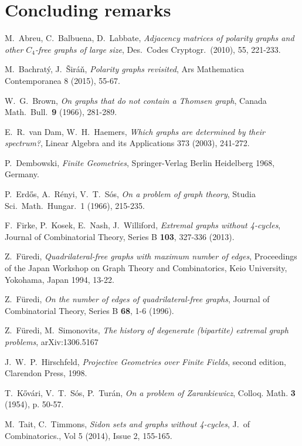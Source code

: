 \documentclass[12pt]{article}
\begin{document}
\section{Concluding remarks}\label{conclusion}
\begin{thebibliography}{10}

    M.\ Abreu, C.\ Balbuena, D.\ Labbate,
    {\em Adjacency matrices of polarity graphs and other $C_4$-free graphs of large size},
    Des.\ Codes Cryptogr.\ (2010), 55, 221-233.

    M.\ Bachrat\'{y}, J.\ \v{S}ir\'{a}\v{n},
    {\em Polarity graphs revisited},
    Ars Mathematica Contemporanea 8 (2015), 55-67.

    W.\ G.\ Brown,
    {\em On graphs that do not contain a Thomsen graph},
    Canada Math.\ Bull.\ {\bf 9} (1966), 281-289.

    E.\ R.\ van Dam, W.\ H.\ Haemers,
    {\em Which graphs are determined by their spectrum?},
    Linear Algebra and its Applications 373 (2003), 241-272.

    P.\ Dembowski,
    {\em Finite Geometries},
    Springer-Verlag Berlin Heidelberg 1968, Germany.

    P.\ Erd\H{o}s, A.\ R\'{e}nyi, V.\ T.\ S\'{o}s,
    {\em On a problem of graph theory},
    Studia Sci.\ Math.\ Hungar.\ 1 (1966), 215-235.

    F.\ Firke, P.\ Kosek, E.\ Nash, J.\ Williford,
    {\em Extremal graphs without 4-cycles}, Journal of Combinatorial Theory, Series B {\bf 103}, 327-336 (2013).

    Z.\ F\"{u}redi,
    {\em Quadrilateral-free graphs with maximum number of edges},
    Proceedings of the Japan Workshop on Graph Theory and Combinatorics,
    Keio University, Yokohama, Japan 1994, 13-22.

    Z.\ F\"{u}redi,
    {\em On the number of edges of quadrilateral-free graphs},
    Journal of Combinatorial Theory, Series B {\bf 68}, 1-6 (1996).

    Z.\ F\"{u}redi, M.\ Simonovits,
    {\em The history of degenerate (bipartite) extremal graph problems},
    arXiv:1306.5167

    J.\ W.\ P.\ Hirschfeld,
    {\em Projective Geometries over Finite Fields}, second edition,
    Clarendon Press, 1998.

    T.\ K\H{o}v\'{a}ri, V.\ T.\ S\'{o}s, P.\ Tur\'{a}n,
    {\em On a problem of Zarankiewicz},
    Colloq. Math. {\bf 3} (1954), p. 50-57.

    M.\ Tait, C.\ Timmons,
    {\em Sidon sets and graphs without 4-cycles},
    J.\ of Combinatorics., Vol 5 (2014), Issue 2, 155-165.



\end{thebibliography}
\end{document}
